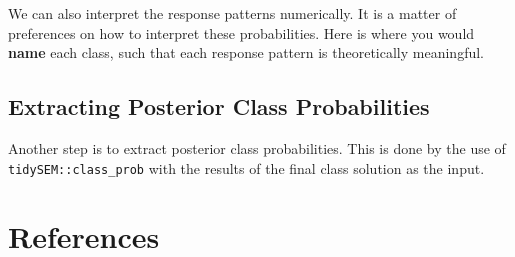 \documentclass[
  ,man,floatsintext]{apa6}
\begin{document}
We can also interpret the response patterns numerically. It is a matter of preferences on how to interpret these probabilities. Here is where you would \textbf{name} each class, such that each response pattern is theoretically meaningful.

\hypertarget{extracting-posterior-class-probabilities}{%
\subsection{Extracting Posterior Class Probabilities}\label{extracting-posterior-class-probabilities}}

Another step is to extract posterior class probabilities. This is done
by the use of \texttt{tidySEM::class\_prob} with the results of the final class
solution as the input.

\newpage

\hypertarget{references}{%
\section*{References}\label{references}}
\end{document}

